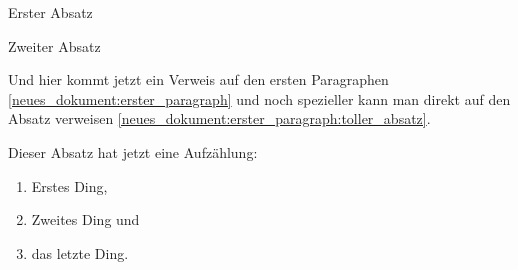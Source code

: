 


\begin{jurdoc}

\label{neues_dokument:erster_paragraph}
Erster Absatz

Zweiter Absatz\label{neues_dokument:erster_paragraph:toller_absatz}


\label{neues_dokument:anderer_paragraph}
Und hier kommt jetzt ein Verweis auf den ersten Paragraphen \ref{neues_dokument:erster_paragraph} und noch spezieller kann man direkt auf den Absatz verweisen \ref{neues_dokument:erster_paragraph:toller_absatz}.

Dieser Absatz hat jetzt eine Aufzählung:
\begin{enumerate}
	\item Erstes Ding,
	\item Zweites Ding und
	\item das letzte Ding.
\end{enumerate}



\end{jurdoc}
